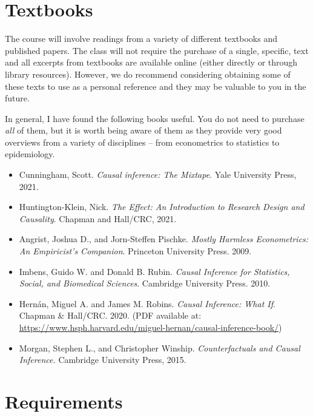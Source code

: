 \documentclass[11pt, article, oneside]{memoir}
\theoremstyle{Assumption}
\begin{document}
\section*{Textbooks} 

The course will involve readings from a variety of different textbooks and published papers. The class will not require the purchase of a single, specific, text and all excerpts from textbooks are available online (either directly or through library resources). However, we do recommend considering obtaining some of these texts to use as a personal reference and they may be valuable to you in the future.

In general, I have found the following books useful. You do not need to purchase \textit{all} of them, but it is worth being aware of them as they provide very good overviews from a variety of disciplines -- from econometrics to statistics to epidemiology.

\begin{itemize}
\item Cunningham, Scott. \emph{Causal inference: The Mixtape}. Yale University Press, 2021.
\item Huntington-Klein, Nick. \emph{The Effect: An Introduction to Research Design and Causality}. Chapman and Hall/CRC, 2021.
\item Angrist, Joshua D., and Jorn-Steffen Pischke. \emph{Mostly Harmless Econometrics: An Empiricist’s Companion}. Princeton University Press. 2009.
\item Imbens, Guido W. and Donald B. Rubin. \emph{Causal Inference for Statistics, Social, and Biomedical Sciences}. Cambridge University Press.  2010.
\item Hern\'an, Miguel A. and  James M. Robins. \emph{Causal Inference: What If}.  Chapman \& Hall/CRC. 2020. (PDF available at: \url{https://www.hsph.harvard.edu/miguel-hernan/causal-inference-book/})
\item Morgan, Stephen L., and Christopher Winship. \emph{Counterfactuals and Causal Inference.} Cambridge University Press, 2015.
\end{itemize}


\section*{Requirements}
\end{document}
